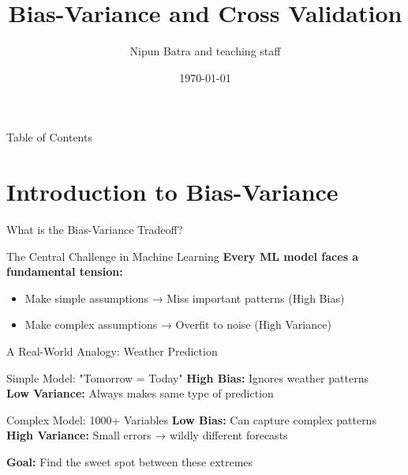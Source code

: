 \documentclass[aspectratio=169,10pt]{beamer}
\title{Bias-Variance and Cross Validation}
\date{\today}
\author{Nipun Batra and teaching staff}
\institute{IIT Gandhinagar}
\begin{document}
\maketitle

\begin{frame}{Table of Contents}
\tableofcontents
\end{frame}

\section{Introduction to Bias-Variance}

\begin{frame}{What is the Bias-Variance Tradeoff?}
\begin{alertbox}{The Central Challenge in Machine Learning}
\textbf{Every ML model faces a fundamental tension:}
\begin{itemize}
\item Make simple assumptions → Miss important patterns (High Bias)
\item Make complex assumptions → Overfit to noise (High Variance)
\end{itemize}
\end{alertbox}


\end{frame}

\begin{frame}{A Real-World Analogy: Weather Prediction}
\begin{examplebox}{Simple Model: "Tomorrow = Today"}
\textbf{High Bias:} Ignores weather patterns \\
\textbf{Low Variance:} Always makes same type of prediction
\end{examplebox}

\begin{examplebox}{Complex Model: 1000+ Variables}
\textbf{Low Bias:} Can capture complex patterns \\
\textbf{High Variance:} Small errors → wildly different forecasts
\end{examplebox}

\textbf{Goal:} Find the sweet spot between these extremes
\end{frame}
\end{document}
